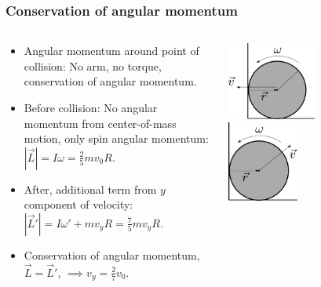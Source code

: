 \documentclass[aspectratio=169]{beamer}
\begin{document}
    \begin{frame}
        \frametitle{Conservation of angular momentum}
        \begin{columns}
            \begin{column}{0.65\textwidth}
                \begin{itemize}
                    \item Angular momentum around point of collision: No arm, no torque, conservation of angular momentum.
                    \item Before collision: No angular momentum from center-of-mass motion, only spin angular momentum:
                    $|\vec L| = I \omega = \frac{2}{5} m v_0 R $.
                    \item After, additional term from $y$ component of velocity: 
                    $|\vec  L'| = I \omega' + mv_y R = \frac{7}{5} m v_y R$.
                    \item Conservation of angular momentum, $\vec L = \vec L'$,
                    $
                        \implies v_y = \frac{2}{7} v_0.
                    $
                \end{itemize}
            \end{column}
            \begin{column}{0.45\textwidth}
                \includegraphics[width=0.5\textwidth]{ball_L.pdf}\\
                \hspace{0.6cm}\includegraphics[width=0.4\textwidth]{ball_L_after.pdf}
            \end{column}
        \end{columns}
    \end{frame}
\end{document}
